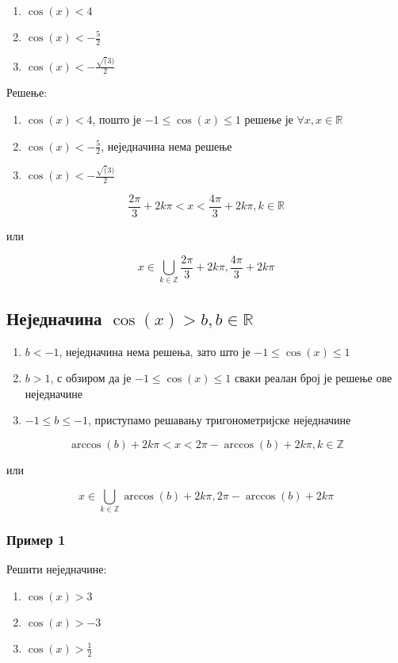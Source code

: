 \documentclass[a4paper,12pt]{article}
\begin{document}
\begin{enumerate}[label=\alph*)]
\item $\cos(x)<4$
\item $\cos(x)<-\frac{5}{2}$
\item $\cos(x)<-\frac{\sqrt(3)}{2}$
\end{enumerate}

Решење:

\begin{enumerate}[label=\alph*)]
\item $\cos(x)<4$, пошто је $-1\leqslant\cos(x)\leqslant1$ решење је $\forall x,x\in\mathbb{R}$
\item $\cos(x)<-\frac{5}{2}$, неједначина нема решење
\item $\cos(x)<-\frac{\sqrt(3)}{2}$
\end{enumerate}

\[\frac{2\pi}{3}+2k\pi<x<\frac{4\pi}{3}+2k\pi,k\in\mathbb{R}\]
\centerline{или}
\[x\in\bigcup_{k\in\mathbb{Z}}\frac{2\pi}{3}+2k\pi,\frac{4\pi}{3}+2k\pi\]


\subsection{Неједначина $\cos(x)>b,b\in\mathbb{R}$}


\begin{enumerate}[label=\alph*)]
\item $b<-1$, неједначина нема решења, зато што је $-1\leq\cos(x)\leq1$
\item $b>1$, с обзиром да је $-1\leq\cos(x)\leq1$ сваки реалан број је решење ове неједначине
\item $-1\leq b\leq-1$, приступамо решавању тригонометријске неједначине
\end{enumerate}

\[\arccos(b)+2k\pi<x<2\pi-\arccos(b)+2k\pi,k\in\mathbb{Z}\]
\centerline{или}
\[x\in\bigcup_{k\in\mathbb{Z}}\arccos(b)+2k\pi,2\pi-\arccos(b)+2k\pi\]


\subsubsection{Пример 1}

Решити неједначине:

\begin{enumerate}[label=\alph*)]
\item $\cos(x)>3$
\item $\cos(x)>-3$
\item $\cos(x)>\frac{1}{2}$
\end{enumerate}
\end{document}
